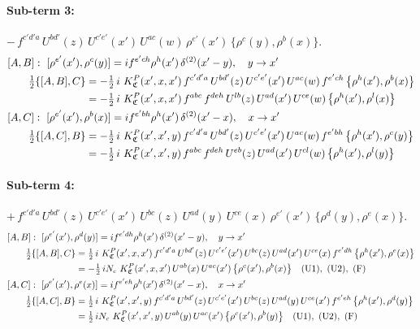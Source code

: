 \documentclass[10pt]{article}
\numberwithin{equation}{section}
\begin{document}
\paragraph{Sub-term 3:} $-\,f^{c'd'a}\,U^{bd'}(z)\,U^{c'e'}(x')\,U^{ac}(w)\,\rho^{e'}(x')\,\big\{\rho^{c}(y),\rho^{b}(x)\big\}$.
\begin{align}
&[A,B]:\ [\rho^{e'}(x'),\rho^{c}(y)]=i f^{e'ch}\rho^{h}(x')\,\delta^{(2)}(x'-y),\quad y\to x'\notag\\
&\qquad \tfrac12\{[A,B],C\}=-\tfrac12\,i\,\,K^{P}_{\mathfrak C}(x',x,x')\,f^{c'd'a}\,U^{bd'}(z)\,U^{c'e'}(x')\,U^{ac}(w)\,f^{e'ch}\,\big\{\rho^{h}(x'),\rho^{b}(x)\big\}\notag\\
&\qquad\phantom{\tfrac12\{[A,B],C\}}=-\tfrac12\,i\,\,K^{P}_{\mathfrak C}(x',x,x')\,f^{abc}\,f^{deh}\,U^{lb}(z)\,U^{ad}(x')\,U^{ce}(w)\,\big\{\rho^{h}(x'),\rho^{l}(x)\big\}
\label{B:eq:GIII.III.P-3-AB}\\
&[A,C]:\ [\rho^{e'}(x'),\rho^{b}(x)]=i f^{e'bh}\rho^{h}(x')\,\delta^{(2)}(x'-x),\quad x\to x'\notag\\
&\qquad \tfrac12\{[A,C],B\}=-\tfrac12\,i\,\,K^{P}_{\mathfrak C}(x',x',y)\,f^{c'd'a}\,U^{bd'}(z)\,U^{c'e'}(x')\,U^{ac}(w)\,f^{e'bh}\,\big\{\rho^{h}(x'),\rho^{c}(y)\big\}\notag\\
&\qquad\phantom{\tfrac12\{[A,C],B\}}=-\tfrac12\,i\,\,K^{P}_{\mathfrak C}(x',x',y)\,f^{abc}\,f^{deh}\,U^{eb}(z)\,U^{ad}(x')\,U^{cl}(w)\,\big\{\rho^{h}(x'),\rho^{l}(y)\big\}
\label{B:eq:GIII.III.P-3-AC}
\end{align}
\paragraph{Sub-term 4:} $+\,f^{c'd'a}\,U^{bd'}(z)\,U^{c'e'}(x')\,U^{bc}(z)\,U^{ad}(y)\,U^{ce}(x)\,\rho^{e'}(x')\,\big\{\rho^{d}(y),\rho^{e}(x)\big\}$.
\begin{align}
&[A,B]:\ [\rho^{e'}(x'),\rho^{d}(y)]=i f^{e'dh}\rho^{h}(x')\,\delta^{(2)}(x'-y),\quad y\to x'\notag\\
&\qquad \tfrac12\{[A,B],C\}=\tfrac12\,i\,\,K^{P}_{\mathfrak C}(x',x,x')\,f^{c'd'a}\,U^{bd'}(z)\,U^{c'e'}(x')\,U^{bc}(z)\,U^{ad}(x')\,U^{ce}(x)\,f^{e'dh}\,\big\{\rho^{h}(x'),\rho^{e}(x)\big\}\notag\\
&\qquad\phantom{\tfrac12\{[A,B],C\}}=-\tfrac12\,i N_{c}\,\,K^{P}_{\mathfrak C}(x',x,x')\,U^{ab}(x)\,U^{ac}(x')\,\big\{\rho^{c}(x'),\rho^{b}(x)\big\}\quad\text{(U1)},\ \text{(U2)},\ \text{(F)}
\label{B:eq:GIII.III.P-4-AB}\\
&[A,C]:\ [\rho^{e'}(x'),\rho^{e}(x)]=i f^{e'eh}\rho^{h}(x')\,\delta^{(2)}(x'-x),\quad x\to x'\notag\\
&\qquad \tfrac12\{[A,C],B\}=\tfrac12\,i\,\,K^{P}_{\mathfrak C}(x',x',y)\,f^{c'd'a}\,U^{bd'}(z)\,U^{c'e'}(x')\,U^{bc}(z)\,U^{ad}(y)\,U^{ce}(x')\,f^{e'eh}\,\big\{\rho^{h}(x'),\rho^{d}(y)\big\}\notag\\
&\qquad\phantom{\tfrac12\{[A,C],B\}}=\tfrac12\,i N_{c}\,\,K^{P}_{\mathfrak C}(x',x',y)\,U^{ab}(y)\,U^{ac}(x')\,\big\{\rho^{c}(x'),\rho^{b}(y)\big\}\quad\text{(U1)},\ \text{(U2)},\ \text{(F)}
\label{B:eq:GIII.III.P-4-AC}
\end{align}
\end{document}

